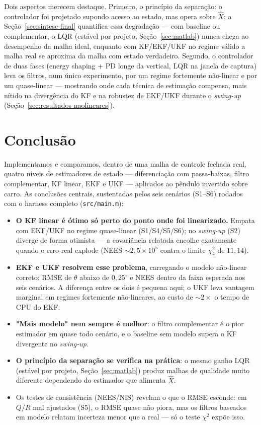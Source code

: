 \documentclass[brazil, 12pt]{article}
\begin{document}
Dois aspectos merecem destaque. Primeiro, o princípio da separação: o
controlador foi projetado supondo acesso ao estado, mas opera sobre $\hat{X}$;
a Seção~\ref{sec:sintese-final} quantifica essa degradação --- com baseline ou
complementar, o LQR (estável por projeto, Seção~\ref{sec:matlab}) nunca chega
ao desempenho da malha ideal, enquanto com KF/EKF/UKF no regime válido a malha
real se aproxima da malha com estado verdadeiro. Segundo, o controlador de
duas fases (energy shaping + PD longe da vertical, LQR na janela de captura)
leva os filtros, num único experimento, por um regime fortemente não-linear e
por um quase-linear --- mostrando onde cada técnica de estimação compensa,
mais nítido na divergência do KF e na robustez de EKF/UKF durante o
\emph{swing-up} (Seção~\ref{sec:resultados-naolineares}).

\section*{Conclusão}

Implementamos e comparamos, dentro de uma malha de controle fechada real,
quatro níveis de estimadores de estado --- diferenciação com passa-baixas,
filtro complementar, KF linear, EKF e UKF --- aplicados ao pêndulo invertido
sobre carro. As conclusões centrais, sustentadas pelos seis cenários (S1--S6)
rodados com o harness completo (\texttt{src/main.m}):

\begin{itemize}
  \item \textbf{O KF linear é ótimo só perto do ponto onde foi linearizado.}
  Empata com EKF/UKF no regime quase-linear (S1/S4/S5/S6); no \emph{swing-up}
  (S2) diverge de forma otimista --- a covariância relatada encolhe
  exatamente quando o erro real explode (NEES $\sim\!2{,}5\times10^{5}$
  contra o limite $\chi^2_4$ de $11{,}14$).
  \item \textbf{EKF e UKF resolvem esse problema}, carregando o modelo
  não-linear correto: RMSE de $\theta$ abaixo de $0{,}25^{\circ}$ e NEES
  dentro da faixa esperada nos seis cenários. A diferença entre os dois é
  pequena aqui; o UKF leva vantagem marginal em regimes fortemente
  não-lineares, ao custo de ${\sim}2\times$ o tempo de CPU do EKF.
  \item \textbf{"Mais modelo" nem sempre é melhor}: o filtro complementar é o
  pior estimador em quase todo cenário, e o baseline sem modelo supera o KF
  divergente no \emph{swing-up}.
  \item \textbf{O princípio da separação se verifica na prática}: o mesmo
  ganho LQR (estável por projeto, Seção~\ref{sec:matlab}) produz malhas de
  qualidade muito diferente dependendo do estimador que alimenta $\hat X$.
  \item Os testes de consistência (NEES/NIS) revelam o que o RMSE esconde: em
  $Q/R$ mal ajustados (S5), o RMSE quase não piora, mas os filtros baseados
  em modelo relatam incerteza menor que a real --- só o teste $\chi^2$ expõe
  isso.
\end{itemize}
\end{document}

